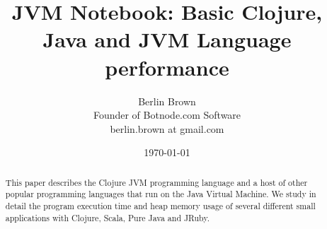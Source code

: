 \documentclass[12pt]{report}
\begin{document}
\title{JVM Notebook: Basic Clojure, Java and JVM Language performance}

\author{Berlin Brown\\
  Founder of Botnode.com Software\\
  berlin.brown at gmail.com
  \date{\today}}

\maketitle


\begin{abstract}
This paper describes the Clojure JVM programming language
and a host of other popular programming languages that run on the
Java Virtual Machine.  We study in detail
the program execution time and heap memory usage
of several different small applications
with Clojure, Scala, Pure Java and JRuby.
\end{abstract}

\tableofcontents




\nocite{*}

\end{document}
